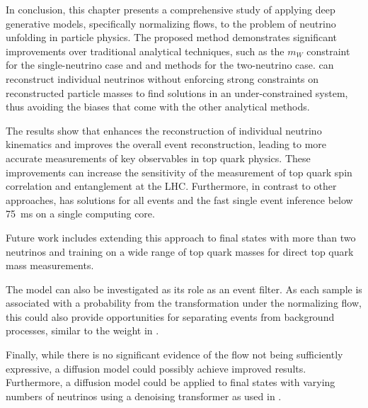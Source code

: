 In conclusion, this chapter presents a comprehensive study of applying deep generative models, specifically normalizing flows, to the problem of neutrino unfolding in particle physics.
The proposed \vvflows method demonstrates significant improvements over traditional analytical techniques, such as the $m_W$ constraint for the single-neutrino case and \vweight and \ellipse methods for the two-neutrino case.
\vvflows can reconstruct individual neutrinos without enforcing strong constraints on reconstructed particle masses to find solutions in an under-constrained system, thus avoiding the biases that come with the other analytical methods.

The results show that \vvflows enhances the reconstruction of individual neutrino kinematics and improves the overall event reconstruction, leading to more accurate measurements of key observables in top quark physics.
These improvements can increase the sensitivity of the measurement of top quark spin correlation and entanglement at the LHC.
Furthermore, in contrast to other approaches, \vvflows has solutions for all events and the fast single event inference below 75~ms on a single computing core.

Future work includes extending this approach to final states with more than two neutrinos and training on a wide range of top quark masses for direct top quark mass measurements.

The model can also be investigated as its role as an event filter.
As each sample is associated with a probability from the transformation under the normalizing flow, this could also provide opportunities for separating \ttbar events from background processes, similar to the weight in \vweight.

Finally, while there is no significant evidence of the flow not being sufficiently expressive, a diffusion model could possibly achieve improved results.
Furthermore, a diffusion model could be applied to final states with varying numbers of neutrinos using a denoising transformer as used in .
